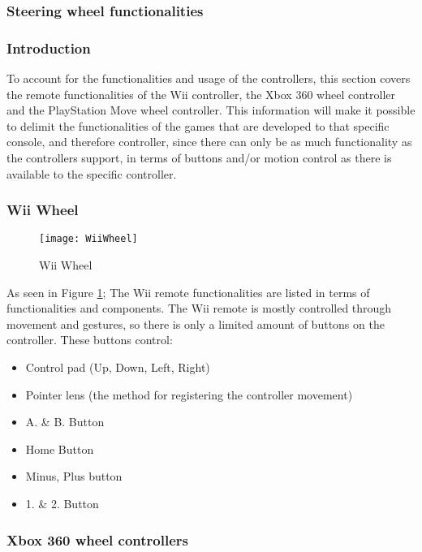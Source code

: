 \subsubsection{Steering wheel functionalities}
\subsubsection*{Introduction}
To account for the functionalities and usage of the controllers, this section covers the remote functionalities of the Wii controller, the Xbox 360 wheel controller and the PlayStation Move wheel controller. This information will make it possible to delimit the functionalities of the games that are developed to that specific console, and therefore controller, since there can only be as much functionality as the controllers support, in terms of buttons and/or motion control as there is available to the specific controller.

\pagebreak[4]

\subsubsection*{Wii Wheel}
\parencite{Nintendo2013}

\begin{figure}[!htbp]
\centering
\texttt{[image: WiiWheel]} 
\caption{Wii Wheel \parencite{Nintendo2013}}
\label{fig:Wiimote}
\end{figure}
\bigskip

As seen in Figure \ref{fig:Wiimote}; The Wii remote functionalities are listed in terms of functionalities and components. The Wii remote is mostly controlled through movement and gestures, so there is only a limited amount of buttons on the controller. These buttons control:
\begin{itemize}
\item Control pad (Up, Down, Left, Right)
\item Pointer lens (the method for registering the controller movement)
\item A. \& B. Button
\item Home Button
\item Minus, Plus button
\item 1. \& 2. Button
\end{itemize}
\bigskip

\pagebreak[4]

\subsubsection*{Xbox 360 wheel controllers}
\parencite{Xbox2013}


